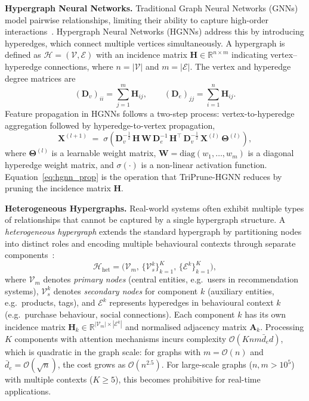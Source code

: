 \documentclass[10pt]{article}
\theoremstyle{plain}
\theoremstyle{definition}
\begin{document}
\textbf{Hypergraph Neural Networks.} Traditional Graph Neural Networks (GNNs) model pairwise relationships, limiting their ability to capture high-order interactions~\citep{feng2019hypergraph}. Hypergraph Neural Networks (HGNNs) address this by introducing hyperedges, which connect multiple vertices simultaneously. A hypergraph is defined as $\mathcal{H}\!=\!(\mathcal{V},\mathcal{E})$ with an incidence matrix $\mathbf{H}\!\in\!\mathbb{R}^{n\times m}$ indicating vertex--hyperedge connections, where $n\!=\!|\mathcal{V}|$ and $m\!=\!|\mathcal{E}|$. The vertex and hyperedge degree matrices are
\begin{equation}
(\mathbf{D}_v)_{ii} = \sum_{j=1}^{m}\mathbf{H}_{ij},
\qquad
(\mathbf{D}_e)_{jj} = \sum_{i=1}^{n}\mathbf{H}_{ij}.
\label{eq:degrees}
\end{equation}
Feature propagation in HGNNs follows a two-step process: vertex-to-hyperedge aggregation followed by hyperedge-to-vertex propagation,
\begin{equation}
\mathbf{X}^{(l+1)} \;=\; \sigma\!\left(
\mathbf{D}_v^{-\frac{1}{2}}\,\mathbf{H}\,\mathbf{W}\,
\mathbf{D}_e^{-1}\,\mathbf{H}^{\top}\,
\mathbf{D}_v^{-\frac{1}{2}}\,\mathbf{X}^{(l)}\,
\boldsymbol{\Theta}^{(l)}\right),
\label{eq:hgnn_prop}
\end{equation}
where $\boldsymbol{\Theta}^{(l)}$ is a learnable weight matrix, $\mathbf{W}\!=\!\mathrm{diag}(w_1,\dots,w_m)$  is a diagonal hyperedge weight matrix, and $\sigma(\cdot)$ is a non-linear activation function. Equation~\eqref{eq:hgnn_prop} is the operation that TriPrune-HGNN reduces by pruning the incidence matrix $\mathbf{H}$.

\textbf{Heterogeneous Hypergraphs.}  Real-world systems often exhibit multiple types of relationships that cannot be captured by a single hypergraph structure. A \emph{heterogeneous hypergraph} extends the standard  hypergraph by partitioning nodes into distinct roles and encoding multiple behavioural contexts through separate components~\citep{kim2024survey}:
\begin{equation}
\mathcal{H}_{\mathrm{het}} = \big(\mathcal{V}_m,\,
\{\mathcal{V}_s^{k}\}_{k=1}^{K},\,
\{\mathcal{E}^{k}\}_{k=1}^{K}\big),
\label{eq:het_hg}
\end{equation}
where $\mathcal{V}_m$ denotes \emph{primary nodes} (central entities, e.g.\ users in recommendation systems), $\mathcal{V}_s^{k}$ denotes \emph{secondary nodes} for component $k$ (auxiliary entities, e.g.\ products, tags), and $\mathcal{E}^{k}$ represents hyperedges in behavioural context $k$ (e.g.\ purchase behaviour, social connections). Each component $k$ has its own incidence matrix $\mathbf{H}_k\!\in\!\mathbb{R}^{|\mathcal{V}_m|\times |\mathcal{E}^{k}|}$ and normalised adjacency matrix $\mathbf{A}_k$. Processing $K$ components with attention mechanisms incurs complexity $\mathcal{O}(Knm\bar{d}_e d)$, which is quadratic in the graph scale: for graphs with $m\!=\!\mathcal{O}(n)$ and $\bar{d}_e\!=\!\mathcal{O}(\sqrt{n})$, the cost grows as $\mathcal{O}(n^{2.5})$. For large-scale graphs ($n,m\!>\!10^{5}$) with multiple contexts ($K\!\geq\!5$), this becomes prohibitive for real-time applications. 
\end{document}
